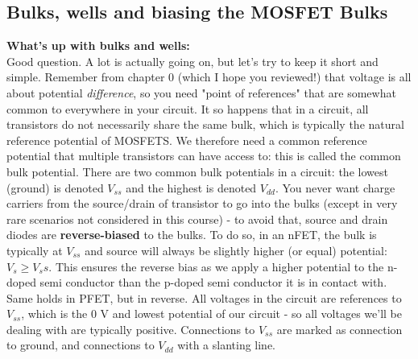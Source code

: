 \subsection{Bulks, wells and biasing the MOSFET Bulks}
\newline \newline
\textbf{What's up with bulks and wells:} \\
Good question. A lot is actually going on, but let's try to keep it short and simple. Remember from chapter 0 (which I hope you reviewed!) that voltage is all about potential \emph{difference}, so you need "point of references" that are somewhat common to everywhere in your circuit. It so happens that in a circuit, all transistors do not necessarily share the same bulk, which is typically the natural reference potential of MOSFETS. We therefore need a common reference potential that multiple transistors can have access to: this is called the common bulk potential. There are two common bulk potentials in a circuit: the lowest (ground) is denoted $V_{ss}$ and the highest is denoted $V_{dd}$.
You never want charge carriers from the source/drain of transistor to go into the bulks (except in very rare scenarios not considered in this course) - to avoid that, source and drain diodes are \textbf{reverse-biased} to the bulks. To do so, in an nFET, the bulk is typically at $V_{ss}$ and source will always be slightly higher (or equal) potential: $V_s \geq V_ss$. This ensures the reverse bias as we apply a higher potential to the n-doped semi conductor than the p-doped semi conductor it is in contact with. Same holds in PFET, but in reverse.
All voltages in the circuit are references to $V_{ss}$, which is the 0 V and lowest potential of our circuit - so all voltages we'll be dealing with are typically positive. Connections to $V_{ss}$ are marked as connection to ground, and connections to $V_{dd}$ with a slanting line. 
